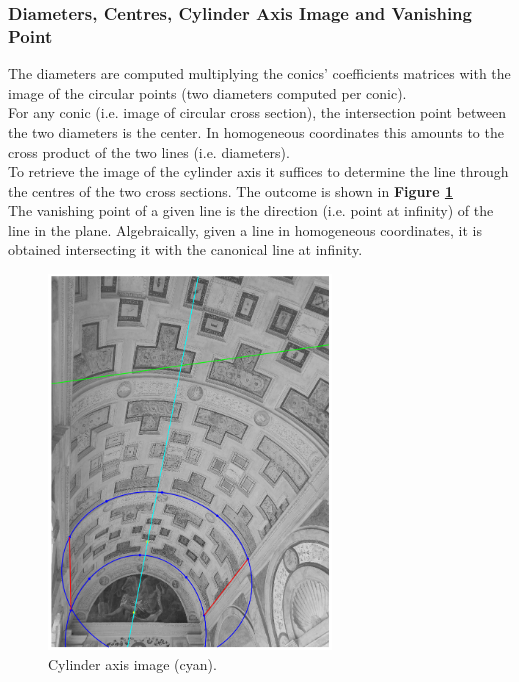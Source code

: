 \documentclass[12pt,a4paper]{article}
\begin{document}
\subsubsection{Diameters, Centres, Cylinder Axis Image and Vanishing Point}\label{sec:toAxisImageVanishingPoint}
The diameters are computed multiplying the conics' coefficients matrices with the image of the circular points (two diameters computed per conic).\\

For any conic (i.e. image of circular cross section), the intersection point between the two diameters is the center. In homogeneous coordinates this amounts to the cross product of the two lines (i.e. diameters).\\

To retrieve the image of the cylinder axis it suffices to determine the line through the centres of the two cross sections. The outcome is shown in \textbf{Figure \ref{fig:axisImage}}\\

The vanishing point of a given line is the direction (i.e. point at infinity) of the line in the plane. Algebraically, given a line in homogeneous coordinates, it is obtained intersecting it with the canonical line at infinity.

\begin{figure}[H]
    \centering
    \includegraphics[width=0.67\textwidth]{Images/PalazzoTe_axis.png}
    \caption[Cylinder Axis Image.]{Cylinder axis image (cyan).}
    \label{fig:axisImage}
\end{figure}
\end{document}
